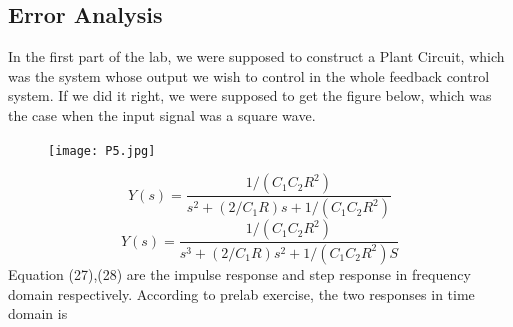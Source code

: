\documentclass[12pt]{article}
\begin{document}
\subsection{Error Analysis}
In the first part of the lab, we were supposed to construct a Plant Circuit, which was the system whose output we wish to control in the whole feedback control system.
If we did it right, we were supposed to get the figure below, which was the case when the input signal was a square wave.
\begin{figure}[H]
\centering
\texttt{[image: P5.jpg]}
\end{figure}
\begin{equation}
Y(s)=\frac{1/(C_1C_2R^2)}{s^2+(2/C_1R)s+1/(C_1C_2R^2)}
\end{equation}
\begin{equation}
Y(s)=\frac{1/(C_1C_2R^2)}{s^3+(2/C_1R)s^2+1/(C_1C_2R^2)S}
\end{equation}
Equation (27),(28) are the impulse response and step response in frequency domain respectively. According to prelab exercise, the two responses in time domain is 
\end{document}
